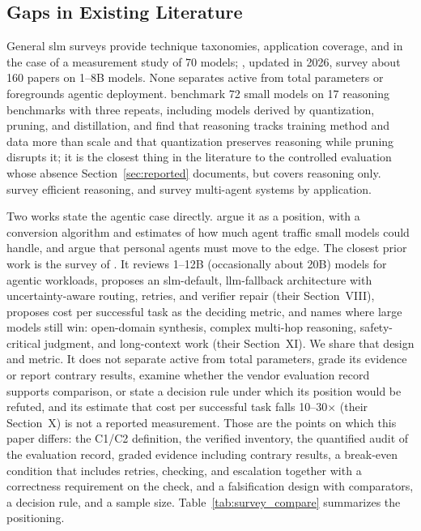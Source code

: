 \subsection{Gaps in Existing Literature}
\label{subsec:background_gaps}

General \gls{slm} surveys \citep{lu2024slmsurvey,vannguyen2024slm_survey,wang2024comprehensive} provide technique taxonomies, application coverage, and in the case of \citet{lu2024slmsurvey} a measurement study of 70 models; \citet{gupta2025slmsurvey}, updated in 2026, survey about 160 papers on 1--8B models. None separates active from total parameters or foregrounds agentic deployment. \citet{srivastava2025thinkslm} benchmark 72 small models on 17 reasoning benchmarks with three repeats, including models derived by quantization, pruning, and distillation, and find that reasoning tracks training method and data more than scale and that quantization preserves reasoning while pruning disrupts it; it is the closest thing in the literature to the controlled evaluation whose absence Section~\ref{sec:reported} documents, but covers reasoning only. \citet{feng2025efficient_reasoning_survey} survey efficient reasoning, and \citet{chen2024mas_survey} survey multi-agent systems by application.

Two works state the agentic case directly. \citet{belcak2025slm_agentic} argue it as a position, with a conversion algorithm and estimates of how much agent traffic small models could handle, and \citet{tian2026edgeagents} argue that personal agents must move to the edge. The closest prior work is the survey of \citet{sharma2025slm_agentic}. It reviews 1--12B (occasionally about 20B) models for agentic workloads, proposes an \gls{slm}-default, \gls{llm}-fallback architecture with uncertainty-aware routing, retries, and verifier repair (their Section~VIII), proposes cost per successful task as the deciding metric, and names where large models still win: open-domain synthesis, complex multi-hop reasoning, safety-critical judgment, and long-context work (their Section~XI). We share that design and metric. It does not separate active from total parameters, grade its evidence or report contrary results, examine whether the vendor evaluation record supports comparison, or state a decision rule under which its position would be refuted, and its estimate that cost per successful task falls 10--30$\times$ (their Section~X) is not a reported measurement. Those are the points on which this paper differs: the C1/C2 definition, the verified inventory, the quantified audit of the evaluation record, graded evidence including contrary results, a break-even condition that includes retries, checking, and escalation together with a correctness requirement on the check, and a falsification design with comparators, a decision rule, and a sample size. Table~\ref{tab:survey_compare} summarizes the positioning.

